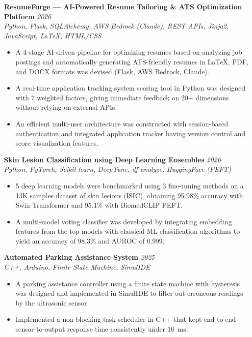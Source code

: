 \documentclass[10pt, letterpaper]{article}
\newcommand{\resumeItem}[1]{\item\small{#1}}
\newcommand{\resumeSubheading}[4]{
  \textbf{#1} \hfill \textit{\small #2} \\
  \textit{\small #3} \hfill \textit{\small #4}
}
\begin{document}
\resumeSubheading{ResumeForge — AI-Powered Resume Tailoring \& ATS Optimization Platform}{2026}{Python, Flask, SQLAlchemy, AWS Bedrock (Claude), REST APIs, Jinja2, JavaScript, LaTeX, HTML/CSS}{}
\begin{itemize}[leftmargin=1.5em, itemsep=0pt, topsep=2pt]
  \resumeItem{A 4-stage AI-driven pipeline for optimizing resumes based on analyzing job postings and automatically generating ATS-friendly resumes in LaTeX, PDF, and DOCX formats was devised (Flask, AWS Bedrock, Claude).}
  \resumeItem{A real-time application tracking system scoring tool in Python was designed with 7 weighted factors, giving immediate feedback on 20+ dimensions without relying on external APIs.}
  \resumeItem{An efficient multi-user architecture was constructed with session-based authentication and integrated application tracker having version control and score visualization features.}
\end{itemize}

\vspace{3pt}

\resumeSubheading{Skin Lesion Classification using Deep Learning Ensembles
}{2026}{Python, PyTorch, Scikit-learn, DeepTune, df-analyze, HuggingFace (PEFT)}{}
\begin{itemize}[leftmargin=1.5em, itemsep=0pt, topsep=2pt]
  \resumeItem{5 deep learning models were benchmarked using 3 fine-tuning methods on a 13K samples dataset of skin lesions (ISIC), obtaining 95.98\% accuracy with Swin Transformer and 95.1\% with BiomedCLIP PEFT.}
  \resumeItem{A multi-model voting classifier was developed by integrating embedding features from the top models with classical ML classification algorithms to yield an accuracy of 98.3\% and AUROC of 0.999.}
\end{itemize}

\vspace{3pt}

\resumeSubheading{Automated Parking Assistance System}{2025}{C++, Arduino, Finite State Machine, SimulIDE}{}
\begin{itemize}[leftmargin=1.5em, itemsep=0pt, topsep=2pt]
  \resumeItem{A parking assistance controller using a finite state machine with hysteresis was designed and implemented in SimulIDE to filter out erroneous readings by the ultrasonic sensor.}
  \resumeItem{Implemented a non-blocking task scheduler in C++ that kept end-to-end sensor-to-output response time consistently under 10~ms.}
\end{itemize}
\end{document}
